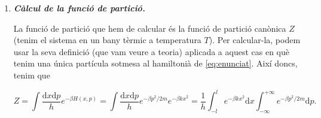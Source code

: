 \documentclass[a4paper, 10pt]{article}
\begin{document}
\begin{enumerate}
	\item \textbf{\textit{Càlcul de la funció de partició.}}

La funció de partició que hem de calcular és la funció de partició canònica $Z$ (tenim el sistema en un bany tèrmic a temperatura $T$). Per calcular-la, podem usar la seva definició (que vam veure a teoria) aplicada a aquest cas en què tenim una única partícula sotmesa al hamiltonià de \eqref{eq:enunciat}. Així doncs, tenim que

\begin{equation}
	Z = \int \frac{\mathrm{d}x\mathrm{d}p}{h}e^{-\beta H(x,p)} = \int \frac{\mathrm{d}x\mathrm{d}p}{h}e^{-\beta p^2/2m}e^{-\beta k x^2} = \frac{1}{h} \int_{-l}^{l} e^{-\beta kx^2}\mathrm{d}x\int_{-\infty}^{+\infty} e^{-\beta p^2/2m} \mathrm{d}p. \label{eqb1:1}
\end{equation}
	

\end{enumerate}
\end{document}
